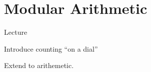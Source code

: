 \chapter{Modular Arithmetic}

\begin{goals}
	\begin{goal}{Lecture}
		\item Introduce counting ``on a dial''
		\item Extend to arithemetic.
	\end{goal}
\end{goals}